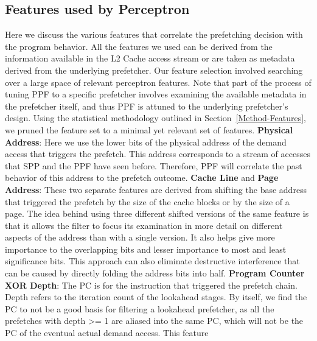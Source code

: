 \subsection{Features used by Perceptron}
\label{Impl-Features}
Here we discuss the various features that correlate the prefetching
decision with the program behavior.  All the features we used can be
derived from the information available in the L2 Cache access stream
or are taken as metadata derived from the {underlying} prefetcher.  Our
feature selection involved searching over a large space of relevant
perceptron features.  Note that part of the process of tuning PPF to a
specific prefetcher involves examining the available metadata in the
prefetcher itself, and thus PPF is attuned to the {underlying}
prefetcher's design. Using the statistical methodology outlined in
Section~\ref{Method-Features}, we pruned the feature set to a minimal
yet relevant set of features.
%
\newline
\newline
\noindent \textbf{Physical Address}: Here we use the lower bits 
of the physical address of 
the demand access that triggers the prefetch. This address corresponds 
to a  stream of accesses that SPP and the PPF have seen before. 
Therefore, PPF will correlate the past behavior of this address 
to the prefetch outcome. 
%
\newline
\newline
\noindent \textbf{Cache Line} and \textbf{Page Address}: These two
separate features are derived from shifting the base address that triggered the
prefetch by the size of the cache blocks or by the size of a page.
The idea behind using
three different shifted versions of the same feature is that it allows
the filter to focus its examination in more detail on different
aspects of the address than with a single version.  It also helps give
more importance to the overlapping bits and lesser importance to most
and least significance bits.  This approach can also eliminate
destructive interference that can be caused by directly folding
the address bits into half.
%
%
\newline
\newline
\noindent \textbf{Program Counter XOR Depth}: The PC is for the
instruction that triggered the prefetch chain.  Depth refers to the
iteration count of the lookahead stages.  By itself, we find the PC to
not be a good basis for filtering a lookahead prefetcher, as all the
prefetches with depth >= 1 are aliased into the same PC, which will
not be the PC of the eventual actual demand access.  This feature
